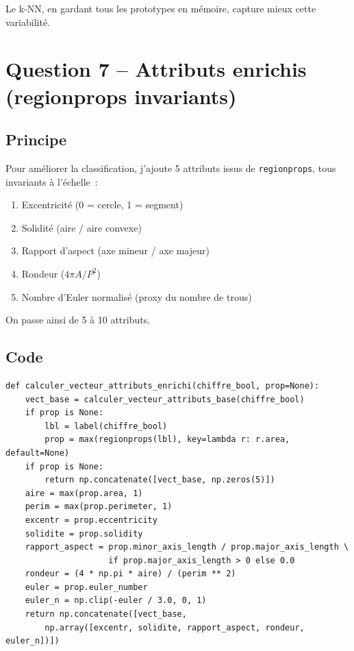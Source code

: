 \documentclass[a4paper,11pt]{article}
\begin{document}
Le k-NN, en gardant tous les prototypes en mémoire, capture mieux cette variabilité.

\section{Question 7 -- Attributs enrichis (regionprops invariants)}

\subsection{Principe}

Pour améliorer la classification, j'ajoute 5 attributs issus de \texttt{regionprops}, tous invariants à l'échelle~:
\begin{enumerate}
    \item Excentricité (0 = cercle, 1 = segment)
    \item Solidité (aire / aire convexe)
    \item Rapport d'aspect (axe mineur / axe majeur)
    \item Rondeur ($4\pi A / P^2$)
    \item Nombre d'Euler normalisé (proxy du nombre de trous)
\end{enumerate}

On passe ainsi de 5 à 10 attributs.

\subsection{Code}

\begin{lstlisting}[style=python, caption={Calcul des attributs enrichis.}]
def calculer_vecteur_attributs_enrichi(chiffre_bool, prop=None):
    vect_base = calculer_vecteur_attributs_base(chiffre_bool)
    if prop is None:
        lbl = label(chiffre_bool)
        prop = max(regionprops(lbl), key=lambda r: r.area, default=None)
    if prop is None:
        return np.concatenate([vect_base, np.zeros(5)])
    aire = max(prop.area, 1)
    perim = max(prop.perimeter, 1)
    excentr = prop.eccentricity
    solidite = prop.solidity
    rapport_aspect = prop.minor_axis_length / prop.major_axis_length \
                     if prop.major_axis_length > 0 else 0.0
    rondeur = (4 * np.pi * aire) / (perim ** 2)
    euler = prop.euler_number
    euler_n = np.clip(-euler / 3.0, 0, 1)
    return np.concatenate([vect_base,
        np.array([excentr, solidite, rapport_aspect, rondeur, euler_n])])
\end{lstlisting}
\end{document}
